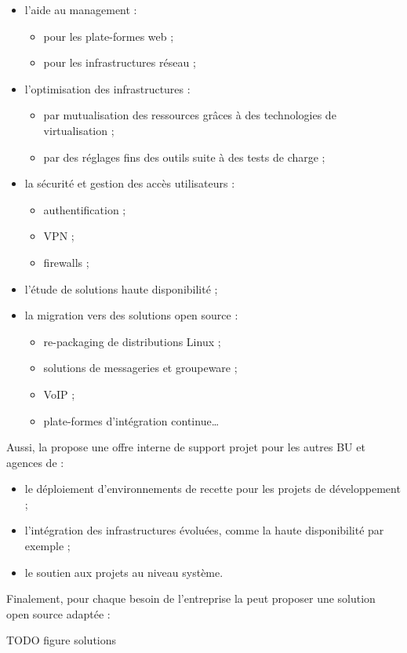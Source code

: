 \begin{itemize}
	\item l'aide au management :
	\begin{itemize}
		\item pour les plate-formes web ;
		\item pour les infrastructures réseau ;
	\end{itemize}
	\item l'optimisation des infrastructures :
	\begin{itemize}
		\item par mutualisation des ressources grâces à des technologies de virtualisation ;
		\item par des réglages fins des outils suite à des tests de charge ;
	\end{itemize}
	\item la sécurité et gestion des accès utilisateurs :
	\begin{itemize}
		\item authentification ;
		\item VPN ;
		\item firewalls ;
	\end{itemize}
	\item l'étude de solutions haute disponibilité ;
	\item la migration vers des solutions open source :
	\begin{itemize}
		\item re-packaging de distributions Linux ;
		\item solutions de messageries et groupeware ;
		\item VoIP ;
		\item plate-formes d'intégration continue\ldots
	\end{itemize}		
\end{itemize}

Aussi, la \abusys{} propose une offre interne de support projet pour les autres BU et agences de
\asmile{} :

\begin{itemize}
	\item le déploiement d'environnements de recette pour les projets de développement ;
	\item l'intégration des infrastructures évoluées, comme la haute disponibilité par exemple ;
	\item le soutien aux projets au niveau système.
\end{itemize}

Finalement, pour chaque besoin de l'entreprise la \abusys{} peut proposer une solution open source adaptée :

TODO figure solutions

